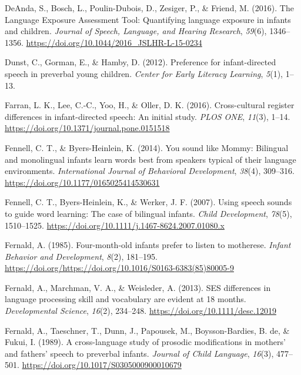 \documentclass[,man,floatsintext]{apa6}
\begin{document}
\leavevmode\hypertarget{ref-deanda_2016}{}%
DeAnda, S., Bosch, L., Poulin-Dubois, D., Zesiger, P., \& Friend, M. (2016). The Language Exposure Assessment Tool: Quantifying language exposure in infants and children. \emph{Journal of Speech, Language, and Hearing Research}, \emph{59}(6), 1346--1356. \url{https://doi.org/10.1044/2016_JSLHR-L-15-0234}

\leavevmode\hypertarget{ref-dunst_2012}{}%
Dunst, C., Gorman, E., \& Hamby, D. (2012). Preference for infant-directed speech in preverbal young children. \emph{Center for Early Literacy Learning}, \emph{5}(1), 1--13.

\leavevmode\hypertarget{ref-farran_2016}{}%
Farran, L. K., Lee, C.-C., Yoo, H., \& Oller, D. K. (2016). Cross-cultural register differences in infant-directed speech: An initial study. \emph{PLOS ONE}, \emph{11}(3), 1--14. \url{https://doi.org/10.1371/journal.pone.0151518}

\leavevmode\hypertarget{ref-fennell_2014}{}%
Fennell, C. T., \& Byers-Heinlein, K. (2014). You sound like Mommy: Bilingual and monolingual infants learn words best from speakers typical of their language environments. \emph{International Journal of Behavioral Development}, \emph{38}(4), 309--316. \url{https://doi.org/10.1177/0165025414530631}

\leavevmode\hypertarget{ref-fennell_2007}{}%
Fennell, C. T., Byers-Heinlein, K., \& Werker, J. F. (2007). Using speech sounds to guide word learning: The case of bilingual infants. \emph{Child Development}, \emph{78}(5), 1510--1525. \url{https://doi.org/10.1111/j.1467-8624.2007.01080.x}

\leavevmode\hypertarget{ref-fernald_1985}{}%
Fernald, A. (1985). Four-month-old infants prefer to listen to motherese. \emph{Infant Behavior and Development}, \emph{8}(2), 181--195. \url{https://doi.org/https://doi.org/10.1016/S0163-6383(85)80005-9}

\leavevmode\hypertarget{ref-fernald_2013}{}%
Fernald, A., Marchman, V. A., \& Weisleder, A. (2013). SES differences in language processing skill and vocabulary are evident at 18 months. \emph{Developmental Science}, \emph{16}(2), 234--248. \url{https://doi.org/10.1111/desc.12019}

\leavevmode\hypertarget{ref-fernald_1989}{}%
Fernald, A., Taeschner, T., Dunn, J., Papousek, M., Boysson-Bardies, B. de, \& Fukui, I. (1989). A cross-language study of prosodic modifications in mothers' and fathers' speech to preverbal infants. \emph{Journal of Child Language}, \emph{16}(3), 477--501. \url{https://doi.org/10.1017/S0305000900010679}
\end{document}
